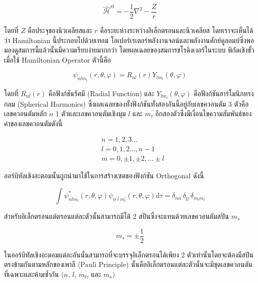 \begin{equation}
    \hat{\mathscr{H}}^{\text{el}}
    =
    - \frac{1}{2} \nabla^{2}-\frac{Z}{r}
\end{equation}

โดยที่ $Z$ คือประจุของนิวเคลียสและ $r$ คือระยะห่างระหว่างอิเล็กตรอนและนิวเคลียส โดยเราจะเห็นได้ว่า Hamiltonian นี้ประกอบไปด้วยเทอม%
โอเปอร์เรเตอร์พลังงานจลน์และพลังงานศักย์คูลอมบ์ซึ่งพอมองดูสมการนี้แล้วนั้นมีความเรียบง่ายมากกว่า โดยผลเฉลยของสมการชโรดิงเงอร์ในระบบ%
พิกัดเชิงขั้วเมื่อใช้ Hamiltonian Operator ตัวนี้คือ

\begin{equation}
    \psi_{nlm_{l}} (r, \theta, \varphi)
    =
    R_{nl}(r) Y_{lm_{l}} (\theta, \varphi)
\end{equation}

\noindent โดยที่ $R_{nl}(r)$ คือฟังก์ชันรัศมี (Radial Function) และ $Y_{lm_{l}}(\theta, \varphi)$ คือฟังก์ชันฮาร์โมนิกทรงกลม
(Spherical Harmonics) ซึ่งผลเฉลยของทั้งฟังก์ชันทั้งสองอันนี้อยู่กับเลขควอนตัม 3 ตัวคือเลขควอนตัมหลัก $n$ 1 ตัวและเลขควอนตัมเชิงมุม
$l$ และ $m_{l}$ อีกสองตัวซึ่งมีเงื่อนไขความสัมพันธ์ของค่าของเลขควอนตัมดังนี้

\begin{equation*}
    \begin{aligned}
         & n = 1,2,3 \ldots                  \\
         & l = 0,1,2 \ldots, n-1             \\
         & m = 0, \pm 1, \pm 2, \ldots \pm l
    \end{aligned}
\end{equation*}

ออร์บิทัลเชิงอะตอมนั้นถูกนำมาใช้ในการสร้างเซตของฟังก์ชัน Orthogonal ดังนี้

\begin{equation}
    \int \psi_{nlm_{l}}^{*} (r, \theta, \varphi)
    \psi_{n^{\prime} l^{\prime} m^{\prime}_{l}} (r, \theta, \varphi)
    \mathrm{d} \tau
    = \delta_{n n^{\prime}}
    \delta_{l l^{\prime}}
    \delta_{m_{l} m_{l}^{\prime}}
\end{equation}

\noindent สำหรับอิเล็กตรอนแต่ตรอนแต่ละตัวนั้นสามารถมีได้ 2 สปินซึ่งจะแทนด้วยเลขควอนตัมสปิน $m_{s}$

\begin{equation}
    m_{s} = \pm \frac{1}{2}
\end{equation}

ในออร์บิทัลเชิงอะตอมแต่ละอันนั้นสามารถที่จะบรรจุอิเล็กตรอนได้เพียง 2 ตัวเท่านั้นโดยจะต้องมีสปินตรงข้ามกันตามหลักของเพาลี (Pauli Principle)
นั้นคืออิเล็กตรอนแต่ละตัวนั้นจะมีชุดเลขควอนตัมที่เฉพาะและห้ามซ้ำกัน $(n$, $l$, $m_{l}$, และ $m_{s})$

